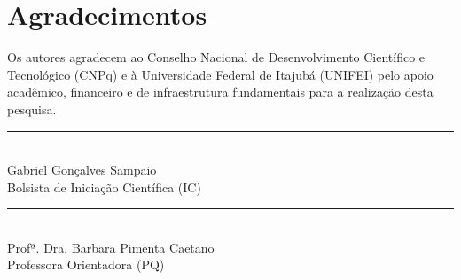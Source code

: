 \section*{Agradecimentos}

Os autores agradecem ao Conselho Nacional de Desenvolvimento Científico e Tecnológico (CNPq) e à Universidade Federal de Itajubá (UNIFEI) pelo apoio acadêmico, financeiro e de infraestrutura fundamentais para a realização desta pesquisa.

\vspace{3.5cm}

\begin{center}
    \begin{minipage}[t]{0.45\textwidth}
        \centering
        \rule{\linewidth}{0.5pt}\\
        Gabriel Gonçalves Sampaio\\
        Bolsista de Iniciação Científica (IC)
    \end{minipage}
    \hfill
    \begin{minipage}[t]{0.45\textwidth}
        \centering
        \rule{\linewidth}{0.5pt}\\
        Profª. Dra. Barbara Pimenta Caetano\\
        Professora Orientadora (PQ)
    \end{minipage}
\end{center}

